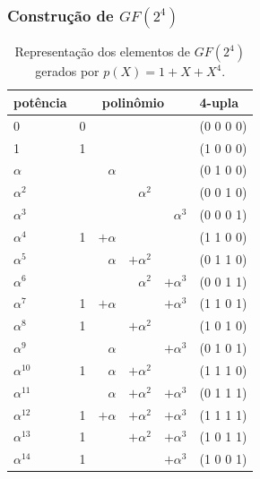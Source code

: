 \begin{frame}
  \frametitle{Construção de $GF(2^4)$}
  \begin{footnotesize}
  \begin{table}
    \caption{Representação dos elementos de $GF(2^4)$ gerados por $p(X)=1+X+X^4$.}
    \begin{tabular}{lrrrrl}
      potência & \multicolumn{4}{c}{polinômio} & 4-upla \\
      \hline
      0          & 0 & & & & (0 0 0 0)\\ 
      1          & 1 & & & & (1 0 0 0) \\
      $\alpha$   & & $\alpha$ & & & (0 1 0 0) \\
      $\alpha^2$ & & & $\alpha^2$ & & (0 0 1 0) \\
      $\alpha^3$ & & & & $\alpha^3$ & (0 0 0 1) \\
      $\alpha^4$ & 1 & $+\alpha$ & & & (1 1 0 0) \\
      $\alpha^5$ & & $\alpha$ & $+\alpha^2$ & & (0 1 1 0) \\
      $\alpha^6$ & & & $\alpha^2$ & $+\alpha^3$ & (0 0 1 1)\\
      $\alpha^7$ & 1 & $+\alpha$ & & $+\alpha^3$ & (1 1 0 1) \\
      $\alpha^8$ & 1 & & $+\alpha^2$ & & (1 0 1 0) \\
      $\alpha^9$ & & $\alpha$ & & $+\alpha^3$ & (0 1 0 1) \\
      $\alpha^{10}$ & 1 & $\alpha$ & $+\alpha^2$ & & (1 1 1 0) \\
      $\alpha^{11}$ & & $\alpha$ & $+\alpha^2$ & $+\alpha^3$ & (0 1 1 1) \\
      $\alpha^{12}$ & 1 & $+\alpha$ & $+\alpha^2$ & $+\alpha^3$ & (1 1 1 1) \\
      $\alpha^{13}$ & 1 & & $+\alpha^2$ & $+\alpha^3$ & (1 0 1 1) \\
      $\alpha^{14}$ & 1 & & & $+\alpha^3$ & (1 0 0 1)
    \end{tabular}
  \end{table}
  \end{footnotesize}
\end{frame}


